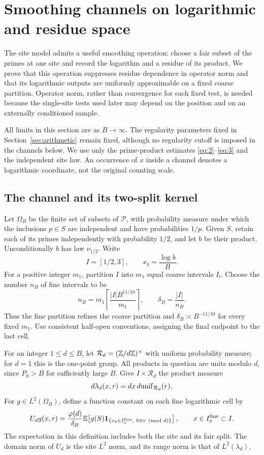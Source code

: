 \section{Smoothing channels on logarithmic and residue space}
\label{sec:channels}

The site model admits a useful smoothing operation: choose a fair subset of
the primes at one site and record the logarithm and a residue of its product.
We prove that this operation suppresses residue dependence in operator norm
and that its logarithmic outputs are uniformly approximable on a fixed
coarse partition.  Operator norm, rather than convergence for each fixed
test, is needed because the single-site tests used later may depend on the
position and on an externally conditioned sample.

All limits in this section are as \(B\to\infty\).  The regularity parameters
fixed in Section~\ref{sec:arithmetic} remain fixed, although no regularity
cutoff is imposed in the channels below.  We use only the prime-product
estimates \eqref{eq:2}--\eqref{eq:3} and the independent site law.
An occurrence of \(x\) inside a channel denotes a logarithmic coordinate,
not the original counting scale.

\subsection{The channel and its two-split kernel}

Let \(\Omega_B\) be the finite set of subsets of \(\mathcal P\), with
probability measure under which the inclusions \(p\in S\) are independent
and have probabilities \(1/p\).  Given \(S\), retain each of its primes
independently with probability \(1/2\), and let \(b\) be their product.
Unconditionally \(b\) has law \(\nu_{1/2}\).
Write
\[
 I=[1/2,3],\qquad x_b=\frac{\log b}{B}.
\]
For a positive integer \(m_1\), partition \(I\) into \(m_1\) equal coarse
intervals \(I_l\).  Choose the number \(n_B\) of fine intervals to be
\[
 n_B=m_1\left\lceil\frac{|I|B^{11/10}}{m_1}\right\rceil,
 \qquad \delta_B=\frac{|I|}{n_B}.
\]
Thus the fine partition refines the coarse partition and
\(\delta_B\asymp B^{-11/10}\) for every fixed \(m_1\).
Use consistent half-open conventions, assigning the final endpoint to
the last cell.

For an integer \(1\le d\le B\), let
\(\mathcal R_d=(\mathbb Z/d\mathbb Z)^\times\) with uniform probability measure;
for \(d=1\) this is the one-point group.  All products in question are
units modulo \(d\), since \(P_0>B\) for sufficiently large \(B\).
Give \(I\times\mathcal R_d\) the product measure
\[
 d\lambda_d(x,r)=dx\,d{\rm unif}_{\mathcal R_d}(r).
\]
For \(g\in L^2(\Omega_B)\), define a function constant on each fine
logarithmic cell by
\begin{equation}\label{eq:30}
 U_dg(x,r)=\frac{\varphi(d)}{\delta_B}
   \mathbb E\!\left[g(S)\mathbf 1_{\{x_b\in I_x^{\rm fine},\ b\equiv r\pmod d\}}\right],
 \qquad x\in I_x^{\rm fine}\subset I .
\end{equation}
The expectation in this definition includes both the site and its fair
split.  The domain norm of \(U_d\) is the site \(L^2\) norm, and its range
norm is that of \(L^2(\lambda_d)\).

